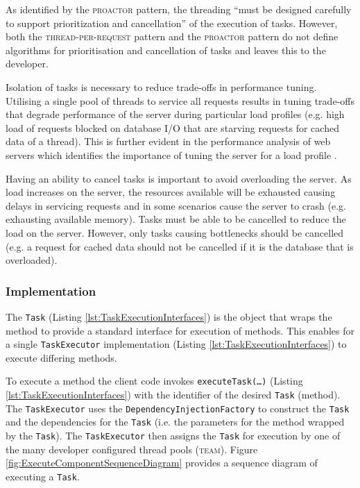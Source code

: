 \documentclass[prodmode]{style/acmlarge}
\begin{document}
As identified by the \textsc{proactor} pattern, the threading ``must be designed
carefully to support prioritization and cancellation'' \cite[p. 8]{proactor} of
the execution of tasks.  However, both the \textsc{thread-per-request} pattern and
the \textsc{proactor} pattern do not define algorithms for
prioritisation and cancellation of tasks and leaves this to the developer.

Isolation of tasks is necessary to reduce trade-offs in performance tuning. 
Utilising a single pool of threads to service all requests results in tuning
trade-offs that degrade performance of the server during particular load
profiles (e.g. high load of requests blocked on database I/O that are starving
requests for cached data of a thread).  This is further evident in the
performance analysis of web servers which identifies the importance of tuning
the server for a load profile
\cite{tuning-important,low-server-footprint,tuning-os-important}.

Having an ability to cancel tasks is important to avoid overloading the server. 
As load increases on the server, the resources available will be exhausted
causing delays in servicing requests and in some scenarios cause the server to
crash (e.g. exhausting available memory).  Tasks must be able to be cancelled to
reduce the load on the server.  However, only tasks causing bottlenecks should
be cancelled (e.g. a request for cached data should not be cancelled if it is
the database that is overloaded).


\subsubsection*{Implementation}

The \texttt{Task} (Listing \ref{lst:TaskExecutionInterfaces}) is the object that wraps
the method to provide a standard interface for execution of methods.  This
enables for a single \texttt{TaskExecutor} implementation (Listing
\ref{lst:TaskExecutionInterfaces}) to execute differing methods.

To execute a method the client code invokes \texttt{executeTask(\ldots)}
(Listing \ref{lst:TaskExecutionInterfaces}) with the identifier of the desired
\texttt{Task} (method).  The \texttt{TaskExecutor} uses the
\texttt{DependencyInjectionFactory} to construct the \texttt{Task}
and the dependencies for the \texttt{Task} (i.e. the parameters for the method
wrapped by the \texttt{Task}).  The \texttt{TaskExecutor} then assigns the
\texttt{Task} for execution by one of the many developer configured thread pools
(\textsc{team}).  Figure \ref{fig:ExecuteComponentSequenceDiagram} provides a
sequence diagram of executing a \texttt{Task}.
\end{document}
